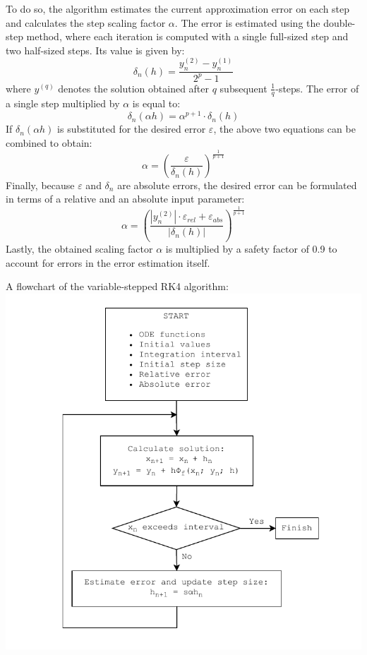 \documentclass{article}
\begin{document}
	To do so, the algorithm estimates the current approximation error on
	each step and calculates the step scaling factor $\alpha$. The error is
	estimated using the double-step method, where each iteration is computed
	with a single full-sized step and two half-sized steps. Its value is
	given by:
	\begin{equation}
		\delta_n(h) = \frac{y^{(2)}_n - y^{(1)}_n}{2^p - 1}
	\end{equation}
	where $y^{(q)}$ denotes the solution obtained after $q$ subsequent
	$\frac{1}{q}$-steps. The error of a single step multiplied by $\alpha$
	is equal to:
	\begin{equation}
		\delta_n(\alpha h) = \alpha^{p + 1} \cdot \delta_n(h)
	\end{equation}
	If $\delta_n(\alpha h)$ is substituted for the desired error
	$\varepsilon$, the above two equations can be combined to obtain:
	\begin{equation}
		\alpha = \left(\frac{\varepsilon}{\delta_n(h)}\right)
		^\frac{1}{p + 1}
	\end{equation}
	Finally, because $\varepsilon$ and $\delta_n$ are absolute errors, the
	desired error can be formulated in terms of a relative and an absolute
	input parameter:
		\begin{equation}
		\alpha = \left(\frac
		{|y^{(2)}_n| \cdot \varepsilon_{rel} + \varepsilon_{abs}}
		{|\delta_n(h)|}\right)
		^\frac{1}{p + 1}
	\end{equation}
	Lastly, the obtained scaling factor $\alpha$ is multiplied by a safety
	factor of 0.9 to account for errors in the error estimation itself.
	
	A flowchart of the variable-stepped RK4 algorithm:\\
	\includegraphics[width=\textwidth]{flowchart}
	
\end{document}

